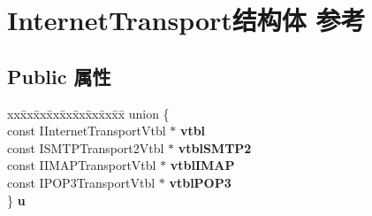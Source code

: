 \hypertarget{struct_internet_transport}{}\section{Internet\+Transport结构体 参考}
\label{struct_internet_transport}
\subsection*{Public 属性}
\begin{DoxyCompactItemize}
\item 
\mbox{\label{struct_internet_transport_abe9a8359b65c02861e5e5989f8986f55}} 
\begin{tabbing}
xx\=xx\=xx\=xx\=xx\=xx\=xx\=xx\=xx\=\kill
union \{\\
\>const IInternetTransportVtbl $\ast$ {\bfseries vtbl}\\
\>const ISMTPTransport2Vtbl $\ast$ {\bfseries vtblSMTP2}\\
\>const IIMAPTransportVtbl $\ast$ {\bfseries vtblIMAP}\\
\>const IPOP3TransportVtbl $\ast$ {\bfseries vtblPOP3}\\
\} {\bfseries u}\\


\end{tabbing}
\end{DoxyCompactItemize}
